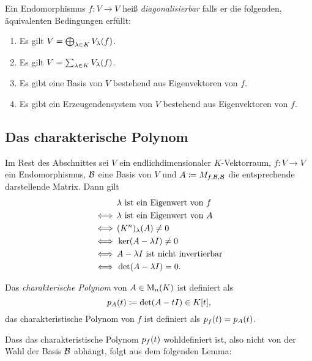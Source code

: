 \begin{definition}
  Ein Endomorphismus $f \colon V \to V$ heiß \emph{diagonalisierbar} falls er die folgenden, äquivalenten Bedingungen erfüllt:
  \begin{enumerate}[label = \arabic*.]
    \item
      Es gilt $V = \bigoplus_{\lambda \in K} V_{\lambda}(f)$.
    \item
      Es gilt $V = \sum_{\lambda \in K} V_{\lambda}(f)$.
    \item
      Es gibt eine Basis von $V$ bestehend aus Eigenvektoren von $f$.
    \item
      Es gibt ein Erzeugendensystem von $V$ bestehend aus Eigenvektoren von $f$.
  \end{enumerate}
\end{definition}





\subsection{Das charakterische Polynom}

Im Rest des Abschnittes sei $V$ ein endlichdimensionaler $K$-Vektorraum, $f \colon V \to V$ ein Endomorphismus, $\mathcal{B}$ eine Basis von $V$ und $A \coloneqq M_{f, \mathcal{B}, \mathcal{B}}$ die entsprechende darstellende Matrix.
Dann gilt
\begin{align*}
      &\, \text{$\lambda$ ist ein Eigenwert von $f$}      \\
  \iff&\, \text{$\lambda$ ist ein Eigenwert von $A$}      \\
  \iff&\, (K^n)_{\lambda}(A) \neq 0           \\
  \iff&\, \ker (A - \lambda I) \neq 0                   \\
  \iff&\, \text{$A - \lambda I$ ist nicht invertierbar} \\
  \iff&\, \det (A - \lambda I) = 0.
\end{align*}

\begin{definition}
  Das \emph{charakterische Polynom} von $A \in \operatorname{M}_{n}(K)$ ist definiert als
  \[
              p_{A}(t)
    \coloneqq \det ( A - t I )
    \in       K[t],
  \]
  das charakteristische Polynom von $f$ ist definiert als $p_{f}(t) = p_{A}(t)$.
\end{definition}

Dass das charakteristische Polynom $p_{f}(t)$ wohldefiniert ist, also nicht von der Wahl der Basis $\mathcal{B}$ abhängt, folgt aus dem folgenden Lemma:

